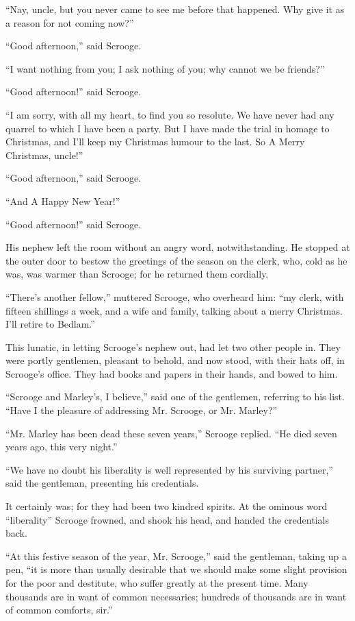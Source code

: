 \documentclass[paper=5.5in:8.5in,BCOR=15mm,twoside,DIV=15,headinclude=off,12pt,chapterprefix=off,openany,headings=huge]{scrbook} %
\begin{document}
\enquote{Nay, uncle, but you never came to see me before that happened. Why give it as a reason for not coming now?}

\enquote{Good afternoon,} said Scrooge.

\enquote{I want nothing from you; I ask nothing of you; why cannot we be friends?}

\enquote{Good afternoon!} said Scrooge.

\enquote{I am sorry, with all my heart, to find you so resolute. We have never had any quarrel to which I have been a party. But I have made the trial in homage to Christmas, and I'll keep my Christmas humour to the last. So A Merry Christmas, uncle!}

\enquote{Good afternoon,} said Scrooge.

\enquote{And A Happy New Year!}

\enquote{Good afternoon!} said Scrooge.

His nephew left the room without an angry word, notwithstanding. He stopped at the outer door to bestow the greetings of the season on the clerk, who, cold as he was, was warmer than Scrooge; for he returned them cordially.

\enquote{There's another fellow,} muttered Scrooge, who overheard him: \enquote{my clerk, with fifteen shillings a week, and a wife and family, talking about a merry Christmas. I'll retire to Bedlam.}

This lunatic, in letting Scrooge's nephew out, had let two other people in. They were portly gentlemen, pleasant to behold, and now stood, with their hats off, in Scrooge's office. They had books and papers in their hands, and bowed to him.

\enquote{Scrooge and Marley's, I believe,} said one of the gentlemen, referring to his list. \enquote{Have I the pleasure of addressing Mr. Scrooge, or Mr. Marley?}

\enquote{Mr. Marley has been dead these seven years,} Scrooge replied. \enquote{He died seven years ago, this very night.}

\enquote{We have no doubt his liberality is well represented by his surviving partner,} said the gentleman, presenting his credentials.

It certainly was; for they had been two kindred spirits. At the ominous word \enquote{liberality} Scrooge frowned, and shook his head, and handed the credentials back.

\enquote{At this festive season of the year, Mr. Scrooge,} said the gentleman, taking up a pen, \enquote{it is more than usually desirable that we should make some slight provision for the poor and destitute, who suffer greatly at the present time. Many thousands are in want of common necessaries; hundreds of thousands are in want of common comforts, sir.}
\end{document}
